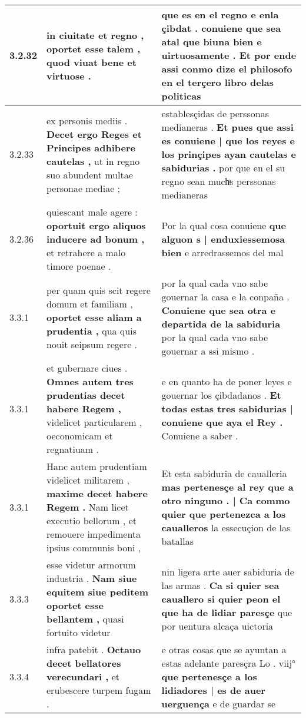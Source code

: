 \begin{tabular}{|p{1cm}|p{6.5cm}|p{6.5cm}|}
3.2.32 & in ciuitate et regno , \textbf{ oportet esse talem , } quod viuat bene et virtuose . & que es en el regno e enla çibdat . \textbf{ conuiene que sea atal que biuna bien e uirtuosamente . } Et por ende assi conmo dize el philosofo en el terçero libro delas politicas \\\hline
3.2.33 & ex personis mediis . \textbf{ Decet ergo Reges et Principes adhibere cautelas , } ut in regno suo abundent multae personae mediae ; & establesçidas de perssonas medianeras . \textbf{ Et pues que assi es conuiene | que los reyes e los prinçipes ayan cautelas e sabidurias . } por que en el su regno sean muchͣs perssonas medianeras \\\hline
3.2.36 & quiescant male agere : \textbf{ oportuit ergo aliquos inducere ad bonum , } et retrahere a malo timore poenae . & Por la qual cosa conuiene \textbf{ que alguon s | enduxiessemosa bien } e arredrassemos del mal \\\hline
3.3.1 & per quam quis scit regere domum et familiam , \textbf{ oportet esse aliam a prudentia , } qua quis nouit seipsum regere . & por la qual cada vno sabe gouernar la casa e la conpaña . \textbf{ Conuiene que sea otra e departida de la sabiduria } por la qual cada vno sabe gouernar a ssi mismo . \\\hline
3.3.1 & et gubernare ciues . \textbf{ Omnes autem tres prudentias decet habere Regem , } videlicet particularem , oeconomicam et regnatiuam . & e en quanto ha de poner leyes e gouernar los çibdadanos . \textbf{ Et todas estas tres sabidurias | conuiene que aya el Rey . } Conuiene a saber . \\\hline
3.3.1 & Hanc autem prudentiam videlicet militarem , \textbf{ maxime decet habere Regem . } Nam licet executio bellorum , et remouere impedimenta ipsius communis boni , & Et esta sabiduria de caualleria \textbf{ mas pertenesçe al rey que a otro ninguno . | Ca commo quier que pertenezca a los caualleros } la essecuçion de las batallas \\\hline
3.3.3 & esse videtur armorum industria . \textbf{ Nam siue equitem siue peditem oportet esse bellantem , } quasi fortuito videtur & nin ligera arte auer sabiduria de las armas . \textbf{ Ca si quier sea cauallero si quier peon el que ha de lidiar paresçe } que por uentura alcaça uictoria \\\hline
3.3.4 & infra patebit . \textbf{ Octauo decet bellatores verecundari , } et erubescere turpem fugam . & e otras cosas que se ayuntan a estas adelante paresçra Lo . viij° \textbf{ que pertenesçe a los lidiadores | es de auer uerguença } e de guardar se \\\hline

\end{tabular}

